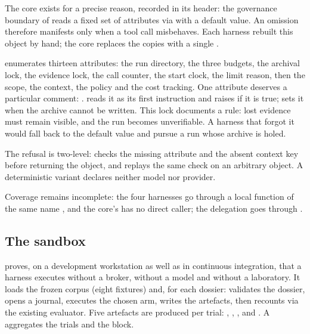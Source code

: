 The core exists for a precise reason, recorded in its header: the governance
boundary of  reads a fixed set of attributes via
 with a default value. An omission therefore manifests only when a
tool call misbehaves. Each harness rebuilt this object by hand; the core replaces
the copies with a single .

 enumerates thirteen attributes: the run directory, the
three budgets, the archival lock, the evidence lock, the call counter, the start
clock, the limit reason, then the scope, the context, the policy and the cost
tracking. One attribute deserves a particular comment:
.  reads it as
its first instruction and raises  if it is true;
 sets it when the archive cannot be written. This lock
documents a rule: lost evidence must remain visible, and the run becomes
unverifiable. A harness that forgot it would fall back to the default value and
pursue a run whose archive is holed.

The refusal is two-level:  checks the missing attribute and the
absent context key before returning the object, and 
replays the same check on an arbitrary object. A deterministic variant declares
neither model nor provider.

Coverage remains incomplete: the four  harnesses go through a
local function of the same name , and the core's 
has no direct caller; the delegation goes through .

\subsection{The sandbox}

 proves, on a development workstation as
well as in continuous integration, that a harness executes without a broker,
without a model and without a laboratory. It loads the frozen corpus (eight
fixtures) and, for each dossier: validates the dossier, opens a journal, executes
the chosen arm, writes the artefacts, then recounts via the existing evaluator.
Five artefacts are produced per trial: , ,
,  and . A
 aggregates the trials and the  block.

